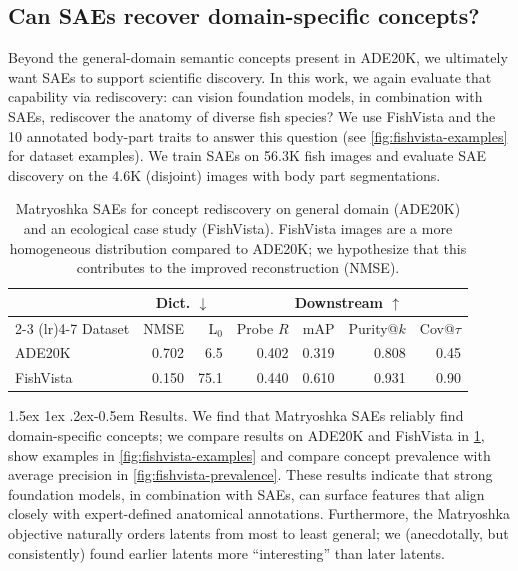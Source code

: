 \documentclass[10pt,twocolumn,letterpaper]{article}
\makeatletter
\newcommand{\todo}[1]{\textbf{\color{red}[TODO: #1]}}
\newcommand{\sam}[1]{\textbf{\color{blue}[Sam: #1]}}
\newcommand{\jake}[1]{\textbf{\color{green}[Jake: #1]}}
\renewcommand{\paragraph}{%
  \@startsection{paragraph}{4}%
  {\z@}{1.5ex \@plus 1ex \@minus .2ex}{-0.5em}%
  {\normalfont\normalsize\bfseries}%
}
\makeatother
\begin{document}
\subsection{Can SAEs recover domain-specific concepts?}
\label{sec:fishvista}

Beyond the general-domain semantic concepts present in ADE20K, we ultimately want SAEs to support scientific discovery.
In this work, we again evaluate that capability via rediscovery: can vision foundation models, in combination with SAEs, rediscover the anatomy of diverse fish species? 
We use FishVista \citep{mehrab2024fishvista,fishvistadataset} and the 10 annotated body-part traits to answer this question (see \cref{fig:fishvista-examples} for dataset examples).
We train SAEs on \num{56.3}K fish images and evaluate SAE discovery on the \num{4.6}K (disjoint) images with body part segmentations.


\begin{table}[t]
    \centering
    \small
    \setlength{\tabcolsep}{3pt}
    \caption{Matryoshka SAEs for concept rediscovery on general domain (ADE20K) and an ecological case study (FishVista). FishVista images are a more homogeneous distribution compared to ADE20K; we hypothesize that this contributes to the improved reconstruction (NMSE).}
    \label{tab:fishvista}
    \begin{tabular}{lrrrrrr}
    \toprule
    & \multicolumn{2}{c}{Dict. $\downarrow$} & \multicolumn{4}{c}{Downstream $\uparrow$} \\
    \cmidrule(lr){2-3} \cmidrule(lr){4-7}
    Dataset & NMSE & L$_0$ & Probe $R$ & mAP & Purity@$k$ & Cov@$\tau$ \\
    \midrule
    ADE20K & 0.702 & 6.5 & 0.402 & 0.319 & 0.808 & 0.45 \\  %
    FishVista & 0.150 & 75.1 & 0.440 & 0.610 & 0.931 & 0.90 \\ %
    \bottomrule
    \end{tabular}
\end{table}


\paragraph{Results.}
We find that Matryoshka SAEs reliably find domain-specific concepts; we compare results on ADE20K and FishVista in \cref{tab:fishvista}, show examples in \cref{fig:fishvista-examples} and compare concept prevalence with average precision in \cref{fig:fishvista-prevalence}.
These results indicate that strong foundation models, in combination with SAEs, can surface features that align closely with expert-defined anatomical annotations.
Furthermore, the Matryoshka objective naturally orders latents from most to least general; we (anecdotally, but consistently) found earlier latents more ``interesting'' than later latents.
\end{document}
